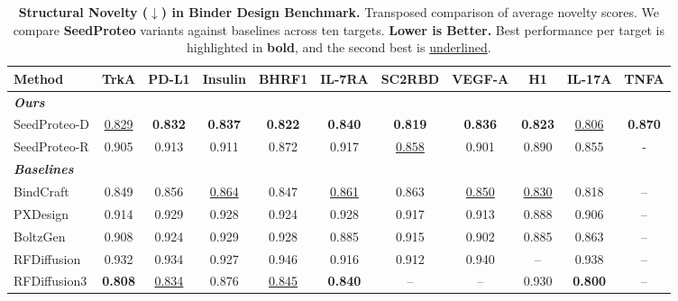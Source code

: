 \documentclass[]{bytedance_seed}
\begin{document}
\begin{table}[t]
\centering
\setlength{\tabcolsep}{4.5pt}
\renewcommand{\arraystretch}{1.0}

\caption{\textbf{Structural Novelty ($\downarrow$) in Binder Design Benchmark.} Transposed comparison of average novelty scores. We compare \textbf{SeedProteo} variants against baselines across ten targets. \textbf{Lower is Better.} Best performance per target is highlighted in \textbf{bold}, and the second best is \underline{underlined}.}
\label{tab:novelty}

\begin{tabular}{l cccccccccc}
\toprule
\textbf{Method} & \textbf{TrkA} & \textbf{PD-L1} & \textbf{Insulin} & \textbf{BHRF1} & \textbf{IL-7RA} & \textbf{SC2RBD} & \textbf{VEGF-A} & \textbf{H1} & \textbf{IL-17A} & \textbf{TNFA} \\
\midrule
\multicolumn{11}{l}{\textit{\textbf{Ours}}} \\
SeedProteo-D & \underline{0.829} & \textbf{0.832} & \textbf{0.837} & \textbf{0.822} & \textbf{0.840} & \textbf{0.819} & \textbf{0.836} & \textbf{0.823} & \underline{0.806} & \textbf{0.870} \\
SeedProteo-R & 0.905 & 0.913 & 0.911 & 0.872 & 0.917 & \underline{0.858} & 0.901 & 0.890 & 0.855 & - \\
\midrule
\multicolumn{11}{l}{\textit{\textbf{Baselines}}} \\
BindCraft    & 0.849 & 0.856 & \underline{0.864} & 0.847 & \underline{0.861} & 0.863 & \underline{0.850} & \underline{0.830} & 0.818 & -- \\
PXDesign     & 0.914 & 0.929 & 0.928 & 0.924 & 0.928 & 0.917 & 0.913 & 0.888 & 0.906 & -- \\
BoltzGen     & 0.908 & 0.924 & 0.929 & 0.928 & 0.885 & 0.915 & 0.902 & 0.885 & 0.863 & -- \\
RFDiffusion  & 0.932 & 0.934 & 0.927 & 0.946 & 0.916 & 0.912 & 0.940 & --    & 0.938 & -- \\
RFDiffusion3 & \textbf{0.808} & \underline{0.834} & 0.876 & \underline{0.845} & \textbf{0.840} & -- & -- & 0.930 & \textbf{0.800} & -- \\
\bottomrule
\end{tabular}
\end{table}
\end{document}
